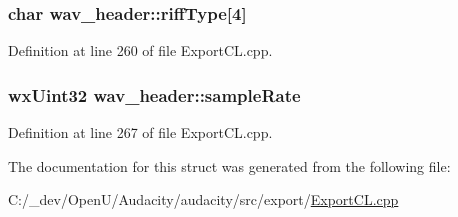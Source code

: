 \subsubsection[{\texorpdfstring{riff\+Type}{riffType}}]{\setlength{\rightskip}{0pt plus 5cm}char wav\+\_\+header\+::riff\+Type\mbox{[}4\mbox{]}}\hypertarget{structwav__header_a3c12f39cfba24571294c0a155e7400f7}{}\label{structwav__header_a3c12f39cfba24571294c0a155e7400f7}


Definition at line 260 of file Export\+C\+L.\+cpp.

\subsubsection[{\texorpdfstring{sample\+Rate}{sampleRate}}]{\setlength{\rightskip}{0pt plus 5cm}wx\+Uint32 wav\+\_\+header\+::sample\+Rate}\hypertarget{structwav__header_ab9b32a2583d8ec68fa0ee3314a18375d}{}\label{structwav__header_ab9b32a2583d8ec68fa0ee3314a18375d}


Definition at line 267 of file Export\+C\+L.\+cpp.



The documentation for this struct was generated from the following file\+:\begin{DoxyCompactItemize}
\item 
C\+:/\+\_\+dev/\+Open\+U/\+Audacity/audacity/src/export/\hyperlink{_export_c_l_8cpp}{Export\+C\+L.\+cpp}\end{DoxyCompactItemize}
